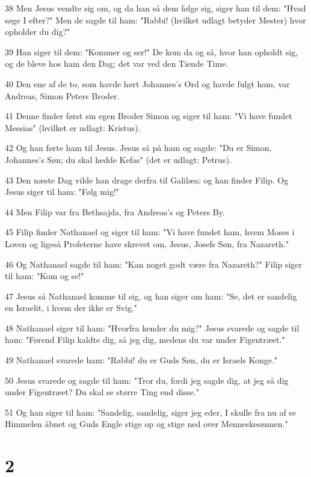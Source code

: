 \par 38 Men Jesus vendte sig om, og da han så dem følge sig, siger han til dem: "Hvad søge I efter?" Men de sagde til ham: "Rabbi! (hvilket udlagt betyder Mester) hvor opholder du dig?"
\par 39 Han siger til dem: "Kommer og ser!" De kom da og så, hvor han opholdt sig, og de bleve hos ham den Dag; det var ved den Tiende Time.
\par 40 Den ene af de to, som havde hørt Johannes's Ord og havde fulgt ham, var Andreas, Simon Peters Broder.
\par 41 Denne finder først sin egen Broder Simon og siger til ham: "Vi have fundet Messias" (hvilket er udlagt: Kristus).
\par 42 Og han førte ham til Jesus. Jesus så på ham og sagde: "Du er Simon, Johannes's Søn; du skal hedde Kefas" (det er udlagt: Petrus).
\par 43 Den næste Dag vilde han drage derfra til Galilæa; og han finder Filip. Og Jesus siger til ham: "Følg mig!"
\par 44 Men Filip var fra Bethsajda, fra Andreas's og Peters By.
\par 45 Filip finder Nathanael og siger til ham: "Vi have fundet ham, hvem Moses i Loven og ligeså Profeterne have skrevet om, Jesus, Josefs Søn, fra Nazareth."
\par 46 Og Nathanael sagde til ham: "Kan noget godt være fra Nazareth?" Filip siger til ham: "Kom og se!"
\par 47 Jesus så Nathanael komme til sig, og han siger om ham: "Se, det er sandelig en Israelit, i hvem der ikke er Svig."
\par 48 Nathanael siger til ham: "Hvorfra kender du mig?" Jesus svarede og sagde til ham: "Førend Filip kaldte dig, så jeg dig, medens du var under Figentræet."
\par 49 Nathanael svarede ham: "Rabbi! du er Guds Søn, du er Israels Konge."
\par 50 Jesus svarede og sagde til ham: "Tror du, fordi jeg sagde dig, at jeg så dig under Figentræet? Du skal se større Ting end disse."
\par 51 Og han siger til ham: "Sandelig, sandelig, siger jeg eder, I skulle fra nu af se Himmelen åbnet og Guds Engle stige op og stige ned over Menneskesønnen."

\chapter{2}

